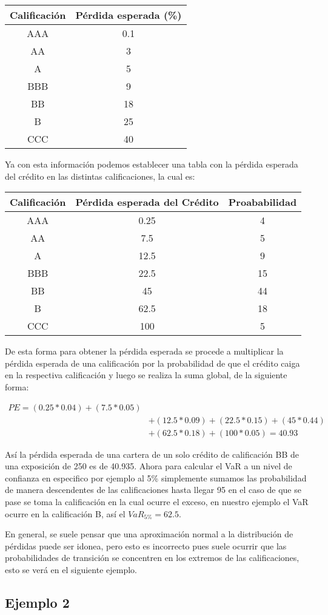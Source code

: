 \documentclass[
  12pt,
]{krantz}
\theoremstyle{definition}
\theoremstyle{definition}
\theoremstyle{definition}
\theoremstyle{remark}
\begin{document}
\begin{longtable}[]{@{}cc@{}}
\toprule
Calificación & Pérdida esperada (\%)\tabularnewline
\midrule
\endhead
AAA & 0.1\tabularnewline
AA & 3\tabularnewline
A & 5\tabularnewline
BBB & 9\tabularnewline
BB & 18\tabularnewline
B & 25\tabularnewline
CCC & 40\tabularnewline
\bottomrule
\end{longtable}

Ya con esta información podemos establecer una tabla con la pérdida esperada del crédito en las distintas calificaciones, la cual es:

\begin{longtable}[]{@{}ccc@{}}
\toprule
Calificación & Pérdida esperada del Crédito & Proababilidad\tabularnewline
\midrule
\endhead
AAA & 0.25 & 4\tabularnewline
AA & 7.5 & 5\tabularnewline
A & 12.5 & 9\tabularnewline
BBB & 22.5 & 15\tabularnewline
BB & 45 & 44\tabularnewline
B & 62.5 & 18\tabularnewline
CCC & 100 & 5\tabularnewline
\bottomrule
\end{longtable}

De esta forma para obtener la pérdida esperada se procede a multiplicar la pérdida esperada de una calificación por la probabilidad de que el crédito caiga en la respectiva calificación y luego se realiza la suma global, de la siguiente forma:

\begin{align*} 
PE = (0.25*0.04)+(7.5*0.05)& \\
&+(12.5*0.09)+(22.5*0.15)+(45*0.44)&\\
&+(62.5*0.18) +(100*0.05)=40.93
\end{align*}

Así la pérdida esperada de una cartera de un solo crédito de calificación BB de una exposición de 250 es de 40.935. Ahora para calcular el VaR a un nivel de confianza en especifico por ejemplo al 5\% simplemente sumamos las probabilidad de manera descendentes de las calificaciones hasta llegar 95 en el caso de que se pase se toma la calificación en la cual ocurre el exceso, en nuestro ejemplo el VaR ocurre en la calificación B, así el \(VaR_{5\%}=62.5\).

En general, se suele pensar que una aproximación normal a la distribución de pérdidas puede ser idonea, pero esto es incorrecto pues suele ocurrir que las probabilidades de transición se concentren en los extremos de las calificaciones, esto se verá en el siguiente ejemplo.

\hypertarget{ejemplo-2}{%
\subsection{Ejemplo 2}\label{ejemplo-2}}
\end{document}
